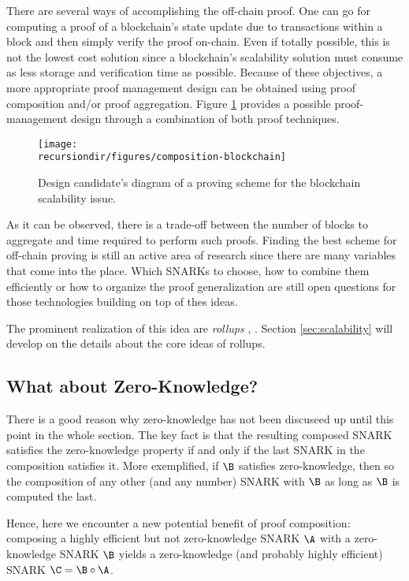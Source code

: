 There are several ways of accomplishing the off-chain proof. One can go for computing a proof of a blockchain's state update due to transactions within a block and then simply verify the proof on-chain. Even if totally possible, this is not the lowest cost solution since a blockchain's scalability solution must consume as less storage and verification time as possible. Because of these objectives, a more appropriate proof management design can be obtained using proof composition and/or proof aggregation.
Figure \ref{fig:composition-blockchain} provides a possible proof-management design through a combination of both proof techniques.
\begin{figure}[H]
	\centering
	\texttt{[image: \\recursiondir/figures/composition-blockchain]}
	\caption{Design candidate's diagram of a proving scheme for the blockchain scalability issue.}
	\label{fig:composition-blockchain}
\end{figure}
As it can be observed, there is a trade-off between the number of blocks to aggregate and time required to perform such proofs. Finding the best scheme for off-chain proving is still an active area of research since there are many variables that come into the place. Which SNARKs to choose, how to combine them efficiently or how to organize the proof generalization are still open questions for those technologies building on top of thes ideas.

The prominent realization of this idea are \textit{rollups} \cite{Thibault2022}, \cite{Lavaur2022}. Section \ref{sec:scalability} will develop on the details about the core ideas of rollups.



\subsection{What about Zero-Knowledge?}

There is a good reason why zero-knowledge has not been discuseed up until this point in the whole section. The key fact is that the resulting composed SNARK satisfies the zero-knowledge property if and only if the last SNARK in the composition satisfies it. More exemplified, if $\B$ satisfies zero-knowledge, then so the composition of any other (and any number) SNARK with $\B$ as long as $\B$ is computed the last.

Hence, here we encounter a new potential benefit of proof composition: composing a highly efficient but not zero-knowledge SNARK $\A$ with a zero-knowledge SNARK $\B$ yields a zero-knowledge (and probably highly efficient) SNARK $\C = \B \circ \A$. 

